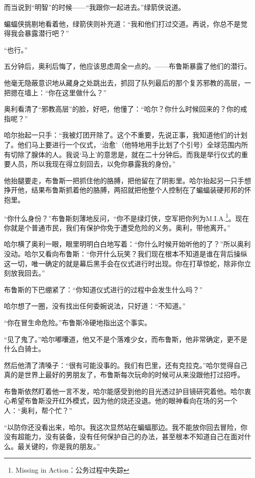 \documentclass[../main]{subfiles}
\begin{document}
而当说到“明智”的时候——“我跟你一起进去。”绿箭侠说道。

蝙蝠侠挑剔地看着他，绿箭侠则补充道：“我和他们打过交道。再说，你总不是觉得我会暴露潜行吧？”

“也行。”

五分钟后，奥利后悔了，他应该思虑周全一点的。——布鲁斯暴露了他们的潜行。

他毫无隐蔽意识地从藏身之处跳出去，抓回了队列最后的那个复苏邪教的高层，一把摁在墙上：“你在这里做什么？”

奥利看清了“邪教高层”的脸，好吧，他懂了：“哈尔？你什么时候回来的？你的戒指呢？”

哈尔抬起一只手：“我被灯团开除了。这个不重要，先说正事，我知道他们的计划了。他们马上要进行一个仪式，‘治愈’（他特地用手比划了个引号）全球范围内所有切除了腺体的人。我说‘马上’的意思是，就在二十分钟后。而我是举行仪式的重要人员，所以我现在得立刻回去，以免你暴露我的身份。”

他抬腿要走，布鲁斯一把抓住他的胳膊，把他留在了阴影里。哈尔抬起另一只手想挣开他，结果布鲁斯抓着他的胳膊，两招就把他整个人控制在了蝙蝠装硬邦邦的怀抱里。

“你什么身份？”布鲁斯刻薄地反问，“你不是绿灯侠，空军把你列为M.I.A.\footnote[1]{Missing in Action：公务过程中失踪}。现在你就是个普通市民，我们有保护你免于遭受危险的义务。奥利，带他离开。”

哈尔横了奥利一眼，眼里明明白白地写着：“你什么时候开始听他的了？”所以奥利没动。哈尔又看向布鲁斯：“你开什么玩笑？我们现在根本不知道是谁在背后操纵这一切，唯一确定的就是幕后黑手会在仪式进行时出现。你在打草惊蛇，除非你立刻放我回去。”

布鲁斯的下巴绷紧了：“你知道仪式进行的过程中会发生什么吗？”

哈尔想了一圈，没有找出任何委婉说法，只好道：“不知道。”

“你在冒生命危险。”布鲁斯冷硬地指出这个事实。

“见了鬼了。”哈尔嘟囔道，他又不是个落难少女，而布鲁斯，他非常确定，更不是什么白骑士。

然后他清了清嗓子：“很有可能没事的。我们有巴里，还有克拉克。”哈尔觉得自己真的是世界上最好的男朋友了，布鲁斯每次玩命的时候可从来没跟他打过招呼。

布鲁斯依然盯着他一言不发，哈尔能感受到他的目光透过护目镜研究着他。哈尔衷心希望布鲁斯没开红外模式，因为他的烧还没退。他的眼神看向在场的另一个人：“奥利，帮个忙？”

“以防你还没看出来，哈尔。我这次显然站在蝙蝠那边。我不能放你回去冒险，你没有超能力，没有装备，没有任何保护自己的办法，甚至根本不知道自己在面对什么。最关键的，你是我的朋友。”
\end{document}
